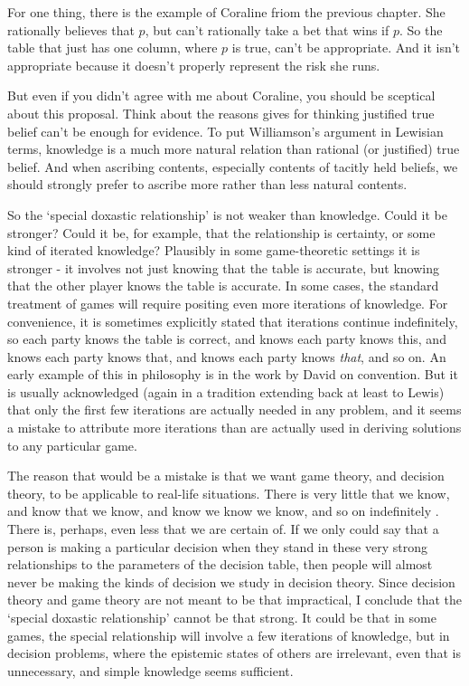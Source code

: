 \documentclass[11pt,]{book}
\begin{document}
For one thing, there is the example of Coraline friom the previous chapter. She rationally believes that \(p\), but can't rationally take a bet that wins if \(p\). So the table that just has one column, where \(p\) is true, can't be appropriate. And it isn't appropriate because it doesn't properly represent the risk she runs.

But even if you didn't agree with me about Coraline, you should be sceptical about this proposal. Think about the reasons \citet[Ch. 9]{Williamson2000} gives for thinking justified true belief can't be enough for evidence. To put Williamson's argument in Lewisian terms, knowledge is a much more natural relation than rational (or justified) true belief. And when ascribing contents, especially contents of tacitly held beliefs, we should strongly prefer
to ascribe more rather than less natural contents.

So the `special doxastic relationship' is not weaker than knowledge. Could it be stronger? Could it be, for example, that the relationship is certainty, or some kind of iterated knowledge? Plausibly in some game-theoretic settings it is stronger - it involves not just knowing that the table is accurate, but knowing that the other player knows the table is accurate. In some cases, the standard treatment of games will require positing even more iterations of knowledge. For convenience, it is sometimes explicitly stated that iterations continue indefinitely, so each party knows the table is correct, and knows each party knows this, and knows each party knows that, and knows each party knows \emph{that}, and so on. An early example of this in philosophy is in the work by David \citet{Lewis1969} on convention. But it is usually acknowledged (again in a tradition extending back at least to Lewis) that only the first few iterations are actually needed in any problem, and it seems a mistake to attribute more iterations than are actually used in deriving solutions to any particular game.

The reason that would be a mistake is that we want game theory, and decision theory, to be applicable to real-life situations. There is very little that we know, and know that we know, and know we know we know, and so on indefinitely \citep[Ch. 4]{Williamson2000}. There is, perhaps, even less that we are certain of. If we only could say that a person is making a particular decision when they stand in these very strong relationships to the parameters of the decision table, then people will almost never be making the kinds of decision we study in decision theory. Since decision theory and game theory are not meant to be that impractical, I conclude that the `special doxastic relationship' cannot be that strong. It could be that in some games, the special relationship will involve a few iterations of knowledge, but in decision problems, where the epistemic states of others are irrelevant, even that is unnecessary, and simple knowledge seems sufficient.
\end{document}
